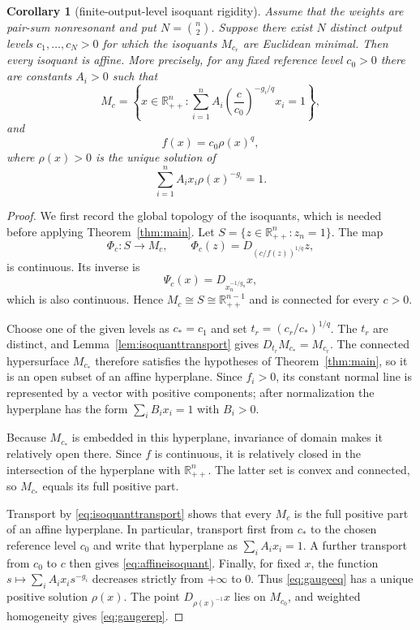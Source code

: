\documentclass[preprint,12pt]{elsarticle}
\numberwithin{equation}{section}
\newtheorem{corollary}[theorem]{Corollary}
\theoremstyle{definition}\newtheorem{definition}[theorem]{Definition}
\theoremstyle{remark}\newtheorem{remark}[theorem]{Remark}
\begin{document}
\begin{corollary}[finite-output-level isoquant rigidity]\label{cor:production}
Assume that the weights are pair-sum nonresonant and put $N=\binom n2$. Suppose there exist $N$ distinct output levels $c_1,\ldots,c_N>0$ for which the isoquants $M_{c_r}$ are Euclidean minimal. Then every isoquant is affine. More precisely, for any fixed reference level $c_0>0$ there are constants $A_i>0$ such that
\begin{equation}\label{eq:affineisoquant}
M_c=\left\{x\in\mathbb R_{++}^n:\sum_{i=1}^n A_i\left(\frac{c}{c_0}\right)^{-g_i/q}x_i=1\right\},
\end{equation}
and
\begin{equation}\label{eq:gaugerep}
f(x)=c_0\rho(x)^q,
\end{equation}
where $\rho(x)>0$ is the unique solution of
\begin{equation}\label{eq:gaugeeq}
\sum_{i=1}^nA_ix_i\rho(x)^{-g_i}=1.
\end{equation}
\end{corollary}
\begin{proof}
We first record the global topology of the isoquants, which is needed before applying Theorem~\ref{thm:main}. Let $S=\{z\in\mathbb R_{++}^n:z_n=1\}$. The map
\[
\Phi_c:S\to M_c,\qquad \Phi_c(z)=D_{(c/f(z))^{1/q}}z,
\]
is continuous. Its inverse is
\[
\Psi_c(x)=D_{x_n^{-1/g_n}}x,
\]
which is also continuous. Hence $M_c\cong S\cong\mathbb R_{++}^{n-1}$ and is connected for every $c>0$.

Choose one of the given levels as $c_*=c_1$ and set $t_r=(c_r/c_*)^{1/q}$. The $t_r$ are distinct, and Lemma~\ref{lem:isoquanttransport} gives $D_{t_r}M_{c_*}=M_{c_r}$. The connected hypersurface $M_{c_*}$ therefore satisfies the hypotheses of Theorem~\ref{thm:main}, so it is an open subset of an affine hyperplane. Since $f_i>0$, its constant normal line is represented by a vector with positive components; after normalization the hyperplane has the form $\sum_iB_ix_i=1$ with $B_i>0$.

Because $M_{c_*}$ is embedded in this hyperplane, invariance of domain makes it relatively open there. Since $f$ is continuous, it is relatively closed in the intersection of the hyperplane with $\mathbb R_{++}^n$. The latter set is convex and connected, so $M_{c_*}$ equals its full positive part.

Transport by \eqref{eq:isoquanttransport} shows that every $M_c$ is the full positive part of an affine hyperplane. In particular, transport first from $c_*$ to the chosen reference level $c_0$ and write that hyperplane as $\sum_iA_ix_i=1$. A further transport from $c_0$ to $c$ then gives \eqref{eq:affineisoquant}. Finally, for fixed $x$, the function $s\mapsto\sum_iA_ix_is^{-g_i}$ decreases strictly from $+\infty$ to $0$. Thus \eqref{eq:gaugeeq} has a unique positive solution $\rho(x)$. The point $D_{\rho(x)^{-1}}x$ lies on $M_{c_0}$, and weighted homogeneity gives \eqref{eq:gaugerep}.
\end{proof}
\end{document}
